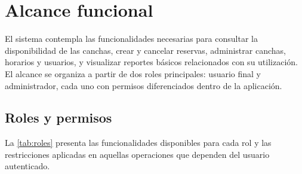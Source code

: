 %

\section{Alcance funcional}
\label{sec:alcance}

El sistema contempla las funcionalidades necesarias para consultar la disponibilidad
de las canchas, crear y cancelar reservas, administrar canchas, horarios y usuarios,
y visualizar reportes básicos relacionados con su utilización. El alcance se organiza
a partir de dos roles principales: usuario final y administrador, cada uno con permisos
diferenciados dentro de la aplicación.

\subsection{Roles y permisos}
\label{sec:roles}

La \cref{tab:roles} presenta las funcionalidades disponibles para cada rol y las
restricciones aplicadas en aquellas operaciones que dependen del usuario autenticado.

